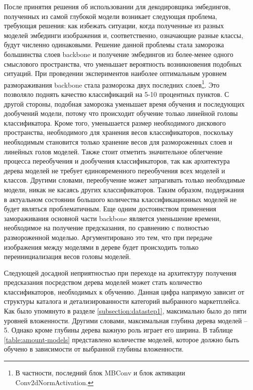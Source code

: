 \documentclass[a4paper,12pt]{extarticle}
\begin{document}
После принятия решения об использовании для декодировщика эмбедингов, полученных из самой глубокой модели возникает следующая проблема, требующая решения: как избежать ситуации, когда полученные из разных моделей эмбединги изображения и, соответственно, означающие разные классы, будут численно одинаковыми. Решение данной проблемы стала заморозка большинства слоев backbone и получение эмбедингов из более-менее одного смыслового пространства, что уменьшает вероятность возникновения подобных ситуаций. При проведении экспериментов наиболее оптимальным уровнем размораживания backbone стала разморозка двух последних слоев\footnote{В частности, последний блок MBConv и блок активации Conv2dNormActivation.}. Это позволяло поднять качество классификаций на 5-10 процентных пунктов. С другой стороны, подобная заморозка уменьшает время обучения и последующих дообучений модели, потому что происходит обучение только линейной головы классификатора. Кроме того, уменьшается размер необходимого дискового пространства, необходимого для хранения весов классификаторов, поскольку необходимым становится только хранение весов для размороженных слоев и линейных голов моделей. Также стоит отметить значительное облегчение процесса переобучения и дообучения классификаторов, так как архитектура дерева моделей не требует единовременного переобучения всех моделей и классов. Другими словами, переобучение может затрагивать только необходимые модели, никак не касаясь других классификаторов. Таким образом, поддержания в актуальном состоянии большого количества классификационных моделей не будет являться проблематичным. Еще одним достоинством применения замораживания основной части backbone является уменьшение времени, необходимое на получение предсказания, по сравнению с полностью размороженной моделью. Аргументировано это тем, что при передаче изображения между моделями в дереве будет происходить только переинициализация весов головы моделей.

Следующей досадной неприятностью при переходе на архитектуру получения предсказания посредством дерева моделей может стать количество классификаторов, необходимых к обучению. Данная цифра напрямую зависит от структуры каталога и детализированности категорий выбранного маркетплейса. Как было упомянуто в разделе \ref{subsection:datastep1}, максимально было до пяти уровней вложенности. Другими словами, максимальная глубина дерева моделей – 5. Однако кроме глубины дерева важную роль играет его ширина. В таблице \ref{table:amount-models} представлено количестве моделей, которое должно быть обучено в зависимости от выбранной глубины вложенности.
\end{document}
